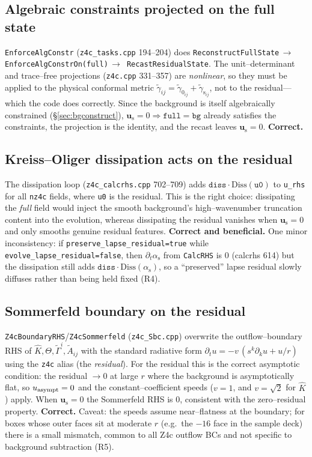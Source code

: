 \documentclass[11pt]{article}
\newcommand{\code}[1]{\texttt{#1}}
\newcommand{\file}[1]{\texttt{#1}}
\newcommand{\gt}{\tilde\gamma}
\newcommand{\At}{\tilde A}
\newcommand{\Gamt}{\tilde\Gamma}
\newcommand{\bg}[1]{#1_{0}}
\newcommand{\res}[1]{#1_{\mathrm s}}
\begin{document}
\subsection{Algebraic constraints projected on the full state}
\label{sec:alg}
\code{EnforceAlgConstr} (\file{z4c\_tasks.cpp} 194--204) does
\code{ReconstructFullState}\,$\to$\,\code{EnforceAlgConstrOn(full)}\,$\to$\,
\code{RecastResidualState}. The unit--determinant and trace--free projections
(\file{z4c.cpp} 331--357) are \emph{nonlinear}, so they must be applied to the
physical conformal metric $\gt_{ij}=\bg{\gt}_{ij}+\res{\gt}_{ij}$, not to the
residual---which the code does correctly. Since the background is itself
algebraically constrained (\S\ref{sec:bgconstruct}), $\res{\bm u}=0\Rightarrow
\code{full}=\code{bg}$ already satisfies the constraints, the projection is the
identity, and the recast leaves $\res{\bm u}=0$. \textbf{Correct.}

\subsection{Kreiss--Oliger dissipation acts on the residual}
\label{sec:diss}
The dissipation loop (\file{z4c\_calcrhs.cpp} 702--709) adds
$\code{diss}\cdot\mathrm{Diss}(\code{u0})$ to \code{u\_rhs} for all
\code{nz4c} fields, where \code{u0} is the residual. This is the right choice:
dissipating the \emph{full} field would inject the smooth background's
high--wavenumber truncation content into the evolution, whereas dissipating the
residual vanishes when $\res{\bm u}=0$ and only smooths genuine residual
features. \textbf{Correct and beneficial.} One minor inconsistency: if
\code{preserve\_lapse\_residual=true} while \code{evolve\_lapse\_residual=false},
then $\partial_t\res\alpha$ from \code{CalcRHS} is $0$ (calcrhs 614) but the
dissipation still adds $\code{diss}\cdot\mathrm{Diss}(\res\alpha)$, so a
``preserved'' lapse residual slowly diffuses rather than being held fixed
(R4).

\subsection{Sommerfeld boundary on the residual}
\label{sec:sbc}
\code{Z4cBoundaryRHS}/\code{Z4cSommerfeld} (\file{z4c\_Sbc.cpp}) overwrite the
outflow--boundary RHS of $\hat K,\Theta,\Gamt^i,\At_{ij}$ with the standard
radiative form $\partial_t u = -v\,(s^k\partial_k u + u/r)$ using the
\code{z4c} alias (the \emph{residual}). For the residual this is the correct
asymptotic condition: the residual $\to 0$ at large $r$ where the background is
asymptotically flat, so $u_{\rm asympt}=0$ and the constant--coefficient
speeds ($v=1$, and $v=\sqrt2$ for $\hat K$) apply. When $\res{\bm u}=0$ the
Sommerfeld RHS is $0$, consistent with the zero--residual property.
\textbf{Correct.} Caveat: the speeds assume near--flatness at the boundary; for
boxes whose outer faces sit at moderate $r$ (e.g.\ the $-16$ face in the sample
deck) there is a small mismatch, common to all Z4c outflow BCs and not
specific to background subtraction (R5).
\end{document}
